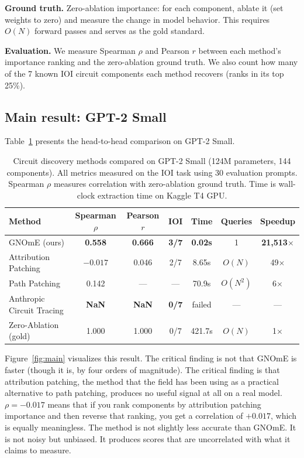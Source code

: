\documentclass[11pt]{article}
\begin{document}
\textbf{Ground truth.} Zero-ablation importance: for each component, ablate it (set weights to zero) and measure the change in model behavior. This requires $O(N)$ forward passes and serves as the gold standard.

\textbf{Evaluation.} We measure Spearman $\rho$ and Pearson $r$ between each method's importance ranking and the zero-ablation ground truth. We also count how many of the 7 known IOI circuit components \citep{wang2023interpretability} each method recovers (ranks in its top 25\%).

\subsection{Main result: GPT-2 Small}

Table~\ref{tab:main} presents the head-to-head comparison on GPT-2 Small.

\begin{table}[t]
\centering
\caption{Circuit discovery methods compared on GPT-2 Small (124M parameters, 144 components). All metrics measured on the IOI task using 30 evaluation prompts. Spearman $\rho$ measures correlation with zero-ablation ground truth. Time is wall-clock extraction time on Kaggle T4 GPU.}
\label{tab:main}
\begin{tabular}{lcccccc}
\toprule
\textbf{Method} & \textbf{Spearman $\rho$} & \textbf{Pearson $r$} & \textbf{IOI} & \textbf{Time} & \textbf{Queries} & \textbf{Speedup} \\
\midrule
GNOmE (ours) & \textbf{0.558} & \textbf{0.666} & \textbf{3/7} & \textbf{0.02s} & 1 & \textbf{21,513$\times$} \\
Attribution Patching & $-0.017$ & 0.046 & 2/7 & 8.65s & $O(N)$ & 49$\times$ \\
Path Patching & 0.142 & --- & --- & 70.9s & $O(N^2)$ & 6$\times$ \\
Anthropic Circuit Tracing & \textbf{NaN} & \textbf{NaN} & \textbf{0/7} & failed & --- & --- \\
Zero-Ablation (gold) & 1.000 & 1.000 & 0/7 & 421.7s & $O(N)$ & 1$\times$ \\
\bottomrule
\end{tabular}
\end{table}

Figure~\ref{fig:main} visualizes this result. The critical finding is not that GNOmE is faster (though it is, by four orders of magnitude). The critical finding is that attribution patching, the method that the field has been using as a practical alternative to path patching, produces no useful signal at all on a real model. $\rho = -0.017$ means that if you rank components by attribution patching importance and then reverse that ranking, you get a correlation of $+0.017$, which is equally meaningless. The method is not slightly less accurate than GNOmE. It is not noisy but unbiased. It produces scores that are uncorrelated with what it claims to measure.
\end{document}
